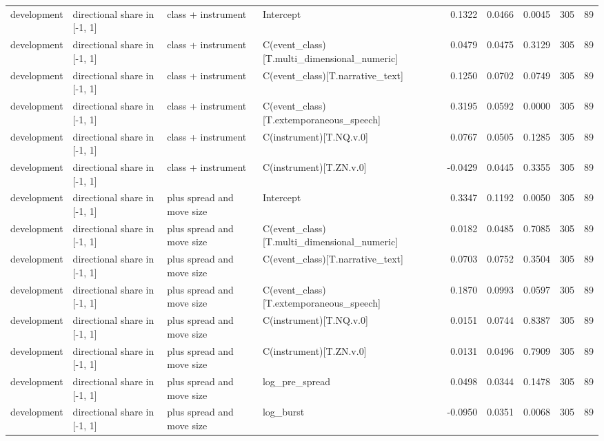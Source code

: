\begin{tabular}{llllrrrrr}
development & directional share in [-1, 1] & class + instrument & Intercept & 0.1322 & 0.0466 & 0.0045 & 305 & 89 \\
development & directional share in [-1, 1] & class + instrument & C(event_class)[T.multi_dimensional_numeric] & 0.0479 & 0.0475 & 0.3129 & 305 & 89 \\
development & directional share in [-1, 1] & class + instrument & C(event_class)[T.narrative_text] & 0.1250 & 0.0702 & 0.0749 & 305 & 89 \\
development & directional share in [-1, 1] & class + instrument & C(event_class)[T.extemporaneous_speech] & 0.3195 & 0.0592 & 0.0000 & 305 & 89 \\
development & directional share in [-1, 1] & class + instrument & C(instrument)[T.NQ.v.0] & 0.0767 & 0.0505 & 0.1285 & 305 & 89 \\
development & directional share in [-1, 1] & class + instrument & C(instrument)[T.ZN.v.0] & -0.0429 & 0.0445 & 0.3355 & 305 & 89 \\
development & directional share in [-1, 1] & plus spread and move size & Intercept & 0.3347 & 0.1192 & 0.0050 & 305 & 89 \\
development & directional share in [-1, 1] & plus spread and move size & C(event_class)[T.multi_dimensional_numeric] & 0.0182 & 0.0485 & 0.7085 & 305 & 89 \\
development & directional share in [-1, 1] & plus spread and move size & C(event_class)[T.narrative_text] & 0.0703 & 0.0752 & 0.3504 & 305 & 89 \\
development & directional share in [-1, 1] & plus spread and move size & C(event_class)[T.extemporaneous_speech] & 0.1870 & 0.0993 & 0.0597 & 305 & 89 \\
development & directional share in [-1, 1] & plus spread and move size & C(instrument)[T.NQ.v.0] & 0.0151 & 0.0744 & 0.8387 & 305 & 89 \\
development & directional share in [-1, 1] & plus spread and move size & C(instrument)[T.ZN.v.0] & 0.0131 & 0.0496 & 0.7909 & 305 & 89 \\
development & directional share in [-1, 1] & plus spread and move size & log_pre_spread & 0.0498 & 0.0344 & 0.1478 & 305 & 89 \\
development & directional share in [-1, 1] & plus spread and move size & log_burst & -0.0950 & 0.0351 & 0.0068 & 305 & 89 \\
\bottomrule
\end{tabular}
